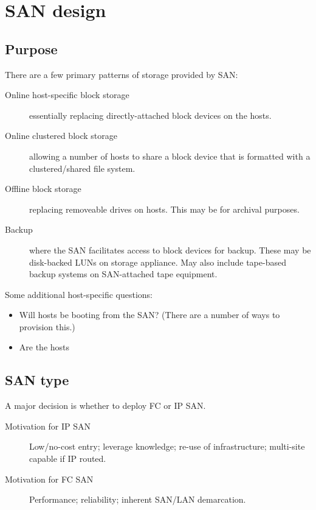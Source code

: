 \chapter{SAN design}
\label{ch:san-design}

\section{Purpose}
\label{purpose}

There are a few primary patterns of storage provided by SAN:

\begin{description}
\item[Online host-specific block storage]
essentially replacing directly-attached block devices on the hosts.
\item[Online clustered block storage]
allowing a number of hosts to share a block device that is formatted
with a clustered/shared file system.
\item[Offline block storage]
replacing removeable drives on hosts. This may be for archival purposes.
\item[Backup]
where the SAN facilitates access to block devices for backup. These may
be disk-backed LUNs on storage appliance. May also include tape-based
backup systems on SAN-attached tape equipment.
\end{description}

Some additional host-specific questions:

\begin{itemize}
\item
  Will hosts be booting from the SAN? (There are a number of ways to
  provision this.)
\item
  Are the hosts
\end{itemize}

\section{SAN type}\label{san-type}

A major decision is whether to deploy FC or IP SAN.

\begin{description}
\item[Motivation for IP SAN]
Low/no-cost entry; leverage knowledge; re-use of infrastructure;
multi-site capable if IP routed.
\item[Motivation for FC SAN]
Performance; reliability; inherent SAN/LAN demarcation.
\end{description}

